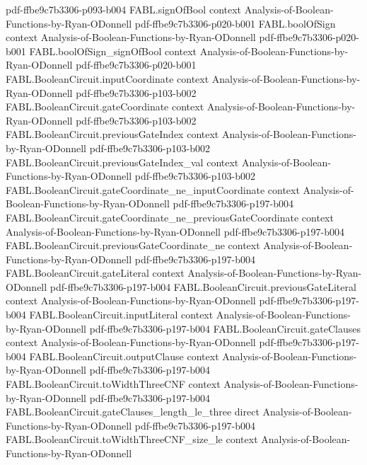 \begin{theorem}
  {pdf-ffbe9c7b3306-p093-b004}
\proofstep
  {FABL.signOfBool}
  {context}
  {Analysis-of-Boolean-Functions-by-Ryan-ODonnell}
  {pdf-ffbe9c7b3306-p020-b001}
\proofstep
  {FABL.boolOfSign}
  {context}
  {Analysis-of-Boolean-Functions-by-Ryan-ODonnell}
  {pdf-ffbe9c7b3306-p020-b001}
\proofstep
  {FABL.boolOfSign_signOfBool}
  {context}
  {Analysis-of-Boolean-Functions-by-Ryan-ODonnell}
  {pdf-ffbe9c7b3306-p020-b001}
\proofstep
  {FABL.BooleanCircuit.inputCoordinate}
  {context}
  {Analysis-of-Boolean-Functions-by-Ryan-ODonnell}
  {pdf-ffbe9c7b3306-p103-b002}
\proofstep
  {FABL.BooleanCircuit.gateCoordinate}
  {context}
  {Analysis-of-Boolean-Functions-by-Ryan-ODonnell}
  {pdf-ffbe9c7b3306-p103-b002}
\proofstep
  {FABL.BooleanCircuit.previousGateIndex}
  {context}
  {Analysis-of-Boolean-Functions-by-Ryan-ODonnell}
  {pdf-ffbe9c7b3306-p103-b002}
\proofstep
  {FABL.BooleanCircuit.previousGateIndex_val}
  {context}
  {Analysis-of-Boolean-Functions-by-Ryan-ODonnell}
  {pdf-ffbe9c7b3306-p103-b002}
\proofstep
  {FABL.BooleanCircuit.gateCoordinate_ne_inputCoordinate}
  {context}
  {Analysis-of-Boolean-Functions-by-Ryan-ODonnell}
  {pdf-ffbe9c7b3306-p197-b004}
\proofstep
  {FABL.BooleanCircuit.gateCoordinate_ne_previousGateCoordinate}
  {context}
  {Analysis-of-Boolean-Functions-by-Ryan-ODonnell}
  {pdf-ffbe9c7b3306-p197-b004}
\proofstep
  {FABL.BooleanCircuit.previousGateCoordinate_ne}
  {context}
  {Analysis-of-Boolean-Functions-by-Ryan-ODonnell}
  {pdf-ffbe9c7b3306-p197-b004}
\proofstep
  {FABL.BooleanCircuit.gateLiteral}
  {context}
  {Analysis-of-Boolean-Functions-by-Ryan-ODonnell}
  {pdf-ffbe9c7b3306-p197-b004}
\proofstep
  {FABL.BooleanCircuit.previousGateLiteral}
  {context}
  {Analysis-of-Boolean-Functions-by-Ryan-ODonnell}
  {pdf-ffbe9c7b3306-p197-b004}
\proofstep
  {FABL.BooleanCircuit.inputLiteral}
  {context}
  {Analysis-of-Boolean-Functions-by-Ryan-ODonnell}
  {pdf-ffbe9c7b3306-p197-b004}
\proofstep
  {FABL.BooleanCircuit.gateClauses}
  {context}
  {Analysis-of-Boolean-Functions-by-Ryan-ODonnell}
  {pdf-ffbe9c7b3306-p197-b004}
\proofstep
  {FABL.BooleanCircuit.outputClause}
  {context}
  {Analysis-of-Boolean-Functions-by-Ryan-ODonnell}
  {pdf-ffbe9c7b3306-p197-b004}
\proofstep
  {FABL.BooleanCircuit.toWidthThreeCNF}
  {context}
  {Analysis-of-Boolean-Functions-by-Ryan-ODonnell}
  {pdf-ffbe9c7b3306-p197-b004}
\proofstep
  {FABL.BooleanCircuit.gateClauses_length_le_three}
  {direct}
  {Analysis-of-Boolean-Functions-by-Ryan-ODonnell}
  {pdf-ffbe9c7b3306-p197-b004}
\proofstep
  {FABL.BooleanCircuit.toWidthThreeCNF_size_le}
  {context}
  {Analysis-of-Boolean-Functions-by-Ryan-ODonnell}

\end{theorem}
